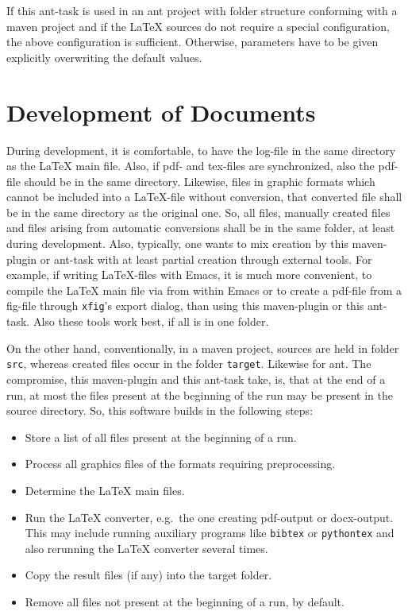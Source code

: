 If this ant-task is used in an ant project 
with folder structure conforming with a maven project 
and if the \LaTeX{} sources do not require a special configuration, 
the above configuration is sufficient. 
Otherwise, parameters have to be given explicitly 
overwriting the default values. 

\section{Development of Documents}\label{sec:devel}

During development, it is comfortable, 
to have the log-file in the same directory as the \LaTeX{} main file. 
Also, if pdf- and tex-files are synchronized, 
also the pdf-file should be in the same directory. 
Likewise, files in graphic formats 
which cannot be included into a \LaTeX-file without conversion, 
that converted file shall be in the same directory as the original one. 
So, all files, manually created files 
and files arising from automatic conversions 
shall be in the same folder, at least during development. 
Also, typically, one wants to mix creation by this maven-plugin or ant-task 
with at least partial creation through external tools. 
For example, if writing \LaTeX-files with Emacs, 
it is much more convenient, to compile the \LaTeX{} main file 
via \pdflatex{} from within Emacs 
or to create a pdf-file from a \gls{fig}-file 
through \texttt{xfig}'s export dialog, 
than using this maven-plugin or this ant-task. 
Also these tools work best, if all is in one folder. 

On the other hand, 
conventionally, in a maven project, 
sources are held in folder \texttt{src}, 
whereas created files occur in the folder \texttt{target}. 
Likewise for ant. 
The compromise, this maven-plugin and this ant-task take, 
is, that at the end of a run, 
at most the files present at the beginning of the run 
may be present in the source directory. 
So, this software builds in the following steps: 
%
\begin{itemize}
\item
Store a list of all files present at the beginning of a run.
\item
Process all graphics files of the formats requiring preprocessing.
\item
Determine the \LaTeX{} main files.
\item
Run the \LaTeX{} converter, e.g.~the one creating pdf-output or docx-output.
This may include running auxiliary programs like \texttt{bibtex} or \texttt{pythontex} 
and also rerunning the \LaTeX{} converter several times. 
\item
Copy the result files (if any) into the target folder.
\item
Remove all files not present at the beginning of a run, by default. 
\end{itemize}

